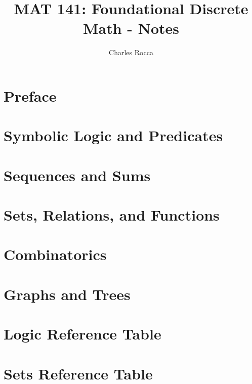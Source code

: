 \documentclass[12pt,twoside]{book}
\title{MAT 141: Foundational Discrete Math - Notes}
\author{Charles Rocca}
\begin{document}
\maketitle


\setcounter{tocdepth}{1}
\tableofcontents

\chapter*{Preface}
    
\cleardoublepage

\chapter{Symbolic Logic and Predicates}
    
\cleardoublepage

\chapter{Sequences and Sums}
    
\cleardoublepage

\chapter{Sets, Relations, and Functions}
    
\cleardoublepage

\chapter{Combinatorics}
    
\cleardoublepage

\chapter{Graphs and Trees}
    
\cleardoublepage


\appendix

\chapter{Logic Reference Table}
    
\cleardoublepage

\chapter{Sets Reference Table}
    
\cleardoublepage


\nocite{rosen2006discrete}
\nocite{grimaldi1994discrete}
\nocite{lin1985set}
\nocite{OEIS}

\printbibliography[heading=bibintoc,]

\printindex
\end{document}
